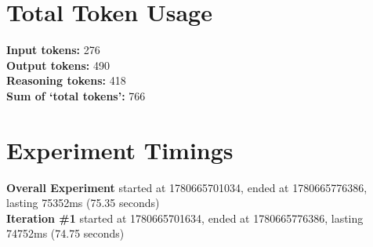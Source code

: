 \documentclass{article}
\begin{document}
\section*{Total Token Usage}
\textbf{Input tokens: }276
\\\textbf{Output tokens: }490
\\\textbf{Reasoning tokens: }418
\\\textbf{Sum of `total tokens': }766
\section*{Experiment Timings}
\textbf{Overall Experiment} started at 1780665701034, ended at 1780665776386, lasting 75352ms (75.35 seconds)
\\\textbf{Iteration \#1} started at 1780665701634, ended at 1780665776386, lasting 74752ms (74.75 seconds)
\end{document}
